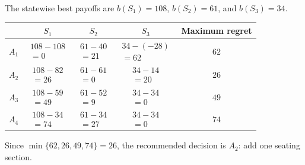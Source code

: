 {		The statewise best payoffs are $b(S_1)=108$, $b(S_2)=61$, and $b(S_3)=34$.
		\begin{center}\renewcommand{\arraystretch}{1.25}\begin{tabular}{lcccc}\toprule
				& $S_1$ & $S_2$ & $S_3$ & Maximum regret\\ \midrule
				$A_1$&$\begin{gathered}108-108\\=0\end{gathered}$&$\begin{gathered}61-40\\=21\end{gathered}$&$\begin{gathered}34-(-28)\\=62\end{gathered}$&$62$\\
				$A_2$&$\begin{gathered}108-82\\=26\end{gathered}$&$\begin{gathered}61-61\\=0\end{gathered}$&$\begin{gathered}34-14\\=20\end{gathered}$&$26$\\
				$A_3$&$\begin{gathered}108-59\\=49\end{gathered}$&$\begin{gathered}61-52\\=9\end{gathered}$&$\begin{gathered}34-34\\=0\end{gathered}$&$49$\\
				$A_4$&$\begin{gathered}108-34\\=74\end{gathered}$&$\begin{gathered}61-34\\=27\end{gathered}$&$\begin{gathered}34-34\\=0\end{gathered}$&$74$\\ \bottomrule\end{tabular}\end{center}
		Since $\min\{62,26,49,74\}=26$, the recommended decision is $\boxed{A_2}$: add one seating section.

	}

